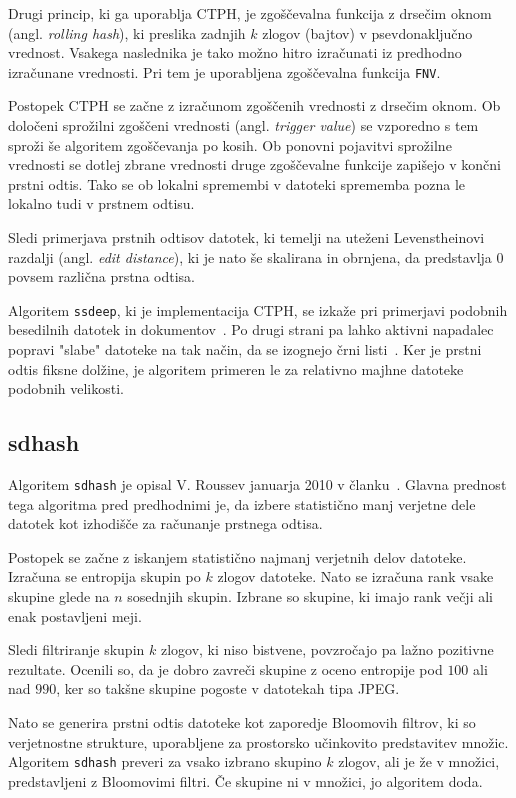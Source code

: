 \documentclass{acm_proc_article-sp}
\begin{document}
Drugi princip, ki ga uporablja CTPH, je zgoščevalna funkcija z drsečim oknom (angl. \emph{rolling hash}), ki preslika zadnjih $k$ zlogov (bajtov) v psevdonaključno vrednost. Vsakega naslednika je tako možno hitro izračunati iz predhodno izračunane vrednosti. Pri tem je uporabljena zgoščevalna funkcija \texttt{FNV}.

Postopek CTPH se začne z izračunom zgoščenih vrednosti z drsečim oknom. Ob določeni sprožilni zgoščeni vrednosti (angl. \emph{trigger value}) se vzporedno s tem sproži še algoritem zgoščevanja po kosih. Ob ponovni pojavitvi sprožilne vrednosti se dotlej zbrane vrednosti druge zgoščevalne funkcije zapišejo v končni prstni odtis.
Tako se ob lokalni spremembi v datoteki sprememba pozna le lokalno tudi v prstnem odtisu.

Sledi primerjava prstnih odtisov datotek, ki temelji na uteženi Levenstheinovi razdalji (angl. \emph{edit distance}), ki je nato še skalirana in obrnjena, da predstavlja $0$ povsem različna prstna odtisa.

Algoritem \texttt{ssdeep}, ki je implementacija CTPH, se izkaže pri primerjavi podobnih besedilnih datotek in dokumentov~\cite{kornblum:ctph}. Po drugi strani pa lahko aktivni napadalec popravi "slabe" datoteke na tak način, da se izognejo črni listi~\cite{fbhash}. Ker je prstni odtis fiksne dolžine, je algoritem primeren le za relativno majhne datoteke podobnih velikosti.

\subsection{sdhash}
Algoritem \texttt{sdhash} je opisal V. Roussev januarja 2010 v članku~\cite{roussev:sdhash}. Glavna prednost tega algoritma pred predhodnimi je, da izbere statistično manj verjetne dele datotek kot izhodišče za računanje prstnega odtisa.

Postopek se začne z iskanjem statistično najmanj verjetnih delov datoteke. Izračuna se entropija skupin po $k$ zlogov datoteke. Nato se izračuna rank vsake skupine glede na $n$ sosednjih skupin. Izbrane so skupine, ki imajo rank večji ali enak postavljeni meji.

Sledi filtriranje skupin $k$ zlogov, ki niso bistvene, povzročajo pa lažno pozitivne rezultate. Ocenili so, da je dobro zavreči skupine z oceno entropije pod $100$ ali nad $990$, ker so takšne skupine pogoste v datotekah tipa JPEG.

Nato se generira prstni odtis datoteke kot zaporedje Bloomovih filtrov, ki so verjetnostne strukture, uporabljene za prostorsko učinkovito predstavitev množic. Algoritem \texttt{sdhash} preveri za vsako izbrano skupino $k$ zlogov, ali je že v množici, predstavljeni z Bloomovimi filtri. Če skupine ni v množici, jo algoritem doda.
\end{document}
